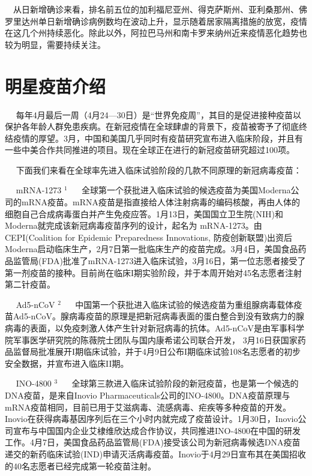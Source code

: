 \documentclass[
]{article}
\begin{document}
\(\quad\)从日新增确诊来看，排名前五位的加利福尼亚州、得克萨斯州、亚利桑那州、佛罗里达州单日新增确诊病例数均在波动上升，显示随着居家隔离措施的放宽，疫情在这几个州持续恶化。除此以外，阿拉巴马州和南卡罗来纳州近来疫情恶化趋势也较为明显，需要持续关注。

\vspace{5mm}

%
  \noindent{}%

\hypertarget{section-4}{%
\section{\texorpdfstring{\textcolor{glaucous}{\Huge 明星疫苗介绍}}{}}\label{section-4}}

\(\quad\)
每年4月最后一周（4月24---30日）是``世界免疫周''，其目的是促进接种疫苗以保护各年龄人群免患疾病。在新冠疫情在全球肆虐的背景下，疫苗被寄予了彻底终结疫情的厚望。3月，中国和美国几乎同时有疫苗研究宣布进入临床阶段，并且有一些中美合作共同推进的项目。现在全球正在进行的新冠疫苗研究超过100项。

\(\quad\)
下面我们来看在全球率先进入临床试验阶段的几款不同原理的新冠病毒疫苗：

\(\quad\) mRNA-1273 \(^1\) \(\quad\)
全球第一个获批进入临床试验的候选疫苗为美国Moderna公司的mRNA疫苗。mRNA疫苗是指直接给人体注射病毒的编码核酸，再由人体的细胞自己合成病毒蛋白并产生免疫应答。1月13日，美国国立卫生院(NIH)和Moderna就完成该新冠病毒疫苗序列的设计，起名为
mRNA-1273。由CEPI(Coalition for Epidemic Preparedness Innovations,
防疫创新联盟)出资后Moderna启动临床生产，2月7日第一批临床生产的疫苗完成。3月4日，美国食品药品监管局(FDA)批准了mRNA-1273进入临床试验，3月16日，第一位志愿者接受了第一剂疫苗的接种。目前尚在临床I期实验阶段，并于本周开始对45名志愿者注射第二针疫苗。

\(\quad\) Ad5-nCoV \(^2\) \(\quad\)
中国第一个获批进入临床试验的候选疫苗为重组腺病毒载体疫苗Ad5-nCoV。腺病毒疫苗的原理是把新冠病毒表面的蛋白整合到没有致病力的腺病毒的表面，以免疫刺激人体产生针对新冠病毒的抗体。Ad5-nCoV是由军事科学院军事医学研究院的陈薇院士团队与国内康希诺公司联合开发，
3月16日获国家药品监督局批准展开I期临床试验，并于4月9日公布I期临床试验108名志愿者的初步安全数据，并宣布进入临床II期。

\(\quad\) INO-4800 \(^3\) \(\quad\)
全球第三款进入临床试验阶段的新冠疫苗，也是第一个候选的DNA疫苗，是来自Inovio
Pharmaceuticals公司的INO-4800。DNA疫苗原理与mRNA疫苗相同，目前已用于艾滋病毒、流感病毒、疟疾等多种疫苗的开发。Inovio在获得病毒基因序列后在三个小时内就完成了疫苗设计。1月30日，Inovio公司宣布与中国国内企业艾棣维欣达成合作协议，共同推进INO-4800在中国的研发工作。4月7日，美国食品药品监管局(FDA)接受该公司为新冠病毒候选DNA疫苗递交的新药临床试验(IND)申请灭活病毒疫苗。Inovio于4月29日宣布其在美国招收的40名志愿者已经完成第一轮疫苗注射。
\end{document}
